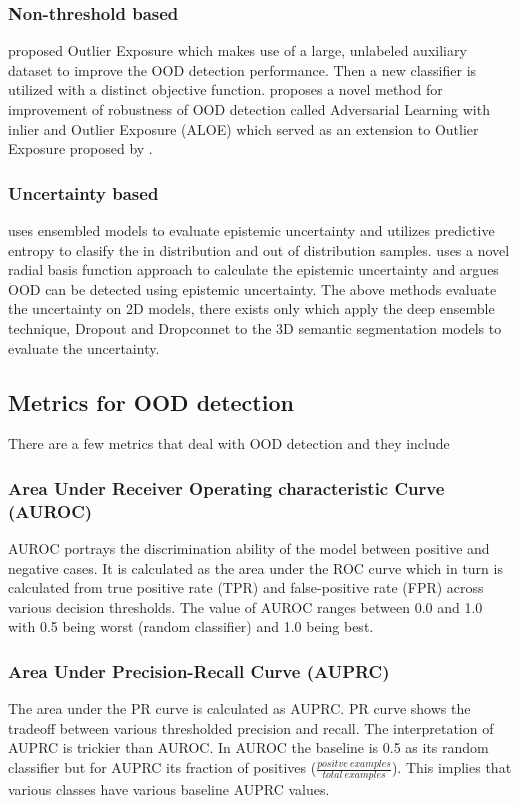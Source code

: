 \documentclass[thesis]{mas_proposal}
\begin{document}
\subsubsection{Non-threshold based}
\cite{hendrycks2018deep_OE} proposed Outlier Exposure which makes use of a large, unlabeled auxiliary dataset to improve the OOD detection performance. 
Then a new classifier is utilized with a distinct objective function. 
\cite{chen2020robust} proposes a novel method for improvement of robustness of OOD detection called Adversarial Learning with inlier and Outlier Exposure (ALOE) which served as an extension to Outlier Exposure proposed by \cite{hendrycks2018deep_OE}.
\subsubsection{Uncertainty based}
\cite{lakshminarayanan2016simple} uses ensembled models to evaluate epistemic uncertainty and utilizes predictive entropy to clasify the in distribution and out of distribution samples.
\cite{pmlr-v119-van-amersfoort20a} uses a novel radial basis function approach to calculate the epistemic uncertainty and argues OOD can be detected using epistemic uncertainty.
The above methods evaluate the uncertainty on 2D models, there exists only \cite{bhandary2020evaluating} which apply the deep ensemble technique, Dropout and Dropconnet to the 3D semantic segmentation models to evaluate the uncertainty.

\subsection{Metrics for OOD detection}
There are a few metrics that deal with OOD detection and they include
\subsubsection{Area Under Receiver Operating characteristic Curve (AUROC)}
AUROC portrays the discrimination ability of the model between positive and negative cases. 
It is calculated as the area under the ROC curve which in turn is calculated from true positive rate (TPR) and false-positive rate (FPR) across various decision thresholds.
The value of AUROC ranges between 0.0 and 1.0 with 0.5 being worst (random classifier) and 1.0 being best.
\subsubsection{Area Under Precision-Recall Curve (AUPRC)}
The area under the PR curve is calculated as AUPRC. 
PR curve shows the tradeoff between various thresholded precision and recall.
The interpretation of AUPRC is trickier than AUROC. 
In AUROC the baseline is 0.5 as its random classifier but for AUPRC its fraction of positives ($\frac{positve\ examples}{total\ examples}$).
This implies that various classes have various baseline AUPRC values.
\end{document}
